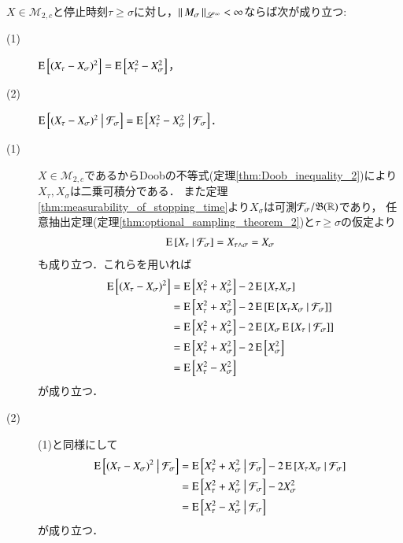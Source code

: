 	\begin{screen}
		\begin{lem}
			$X \in \mathcal{M}_{2,c}$と停止時刻$\tau \geq \sigma$に対し，$\left\|\, M_\sigma\, \right\|_{\mathscr{L}^\infty} < \infty$ならば次が成り立つ:
			\begin{description}
				\item[(1)] $\operatorname{E} \left[ (X_{\tau} - X_{\sigma})^2 \right] = \operatorname{E} \left[ X_{\tau}^2 - X_{\sigma}^2 \right]$，
				\item[(2)] $\operatorname{E} \left[ (X_{\tau} - X_{\sigma})^2 \ \middle|\ \mathcal{F}_\sigma \right] = \operatorname{E} \left[ X_{\tau}^2 - X_{\sigma}^2 \ \middle|\ \mathcal{F}_\sigma \right]$．
			\end{description}
			\label{lem:stopping_time_telescopic_sum}
		\end{lem}
	\end{screen}
	
	\begin{prf}\mbox{}
	\begin{description}
		\item[(1)] 
			$X \in \mathcal{M}_{2,c}$であるからDoobの不等式(定理\ref{thm:Doob_inequality_2})により$X_\tau,X_\sigma$は二乗可積分である．
			また定理\ref{thm:measurability_of_stopping_time}より$X_\sigma$は可測$\mathcal{F}_\sigma/\mathfrak{B}(\mathbb{R})$であり，
			任意抽出定理(定理\ref{thm:optional_sampling_theorem_2})と$\tau \geq \sigma$の仮定より
			\begin{align}
				\operatorname{E} \left[ X_{\tau} \ \middle|\ \mathcal{F}_\sigma \right] = X_{\tau \wedge \sigma} = X_\sigma
			\end{align}
			も成り立つ．これらを用いれば
			\begin{align}
				\operatorname{E} \left[ (X_{\tau} - X_{\sigma})^2 \right]
				&= \operatorname{E} \left[ X_{\tau}^2 + X_{\sigma}^2 \right] - 2\operatorname{E} \left[ X_{\tau}X_{\sigma} \right] \\
				&= \operatorname{E} \left[ X_{\tau}^2 + X_{\sigma}^2 \right] - 2\operatorname{E} \left[ \operatorname{E} \left[ X_{\tau}X_{\sigma} \ \middle|\ \mathcal{F}_\sigma \right] \right] \\
				&= \operatorname{E} \left[ X_{\tau}^2 + X_{\sigma}^2 \right] - 2\operatorname{E} \left[ X_{\sigma}\operatorname{E} \left[ X_{\tau} \ \middle|\ \mathcal{F}_\sigma \right] \right] \\
				&= \operatorname{E} \left[ X_{\tau}^2 + X_{\sigma}^2 \right] - 2\operatorname{E} \left[ X_{\sigma}^2 \right] \\
				&= \operatorname{E} \left[ X_{\tau}^2 - X_{\sigma}^2 \right]
			\end{align}
			が成り立つ．
			
		\item[(2)]
			(1)と同様にして
			\begin{align}
				\operatorname{E} \left[ (X_{\tau} - X_{\sigma})^2 \ \middle|\ \mathcal{F}_\sigma \right]
				&= \operatorname{E} \left[ X_{\tau}^2 + X_{\sigma}^2 \ \middle|\ \mathcal{F}_\sigma \right] - 2\operatorname{E} \left[ X_{\tau}X_{\sigma} \ \middle|\ \mathcal{F}_\sigma \right] \\
				&= \operatorname{E} \left[ X_{\tau}^2 + X_{\sigma}^2 \ \middle|\ \mathcal{F}_\sigma \right] - 2X_{\sigma}^2 \\
				&= \operatorname{E} \left[ X_{\tau}^2 - X_{\sigma}^2 \ \middle|\ \mathcal{F}_\sigma \right]
			\end{align}
			が成り立つ．
		\end{description}
		\QED
	\end{prf}
	
